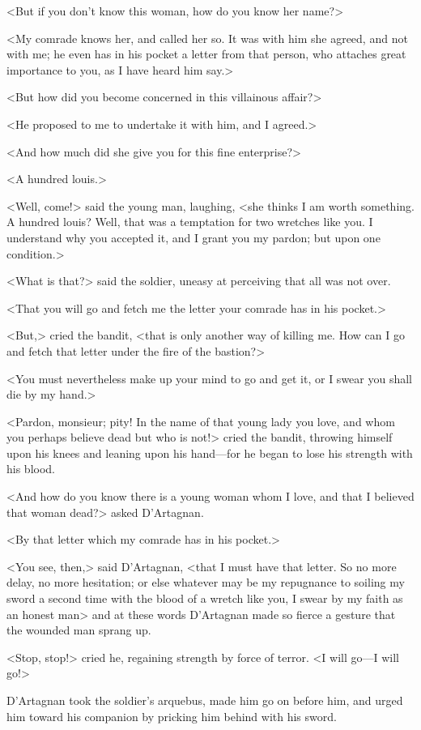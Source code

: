 <But if you don't know this woman, how do you know her name?> 

<My comrade knows her, and called her so. It was with him she agreed, and not with me; he even has in his pocket a letter from that person, who attaches great importance to you, as I have heard him say.> 

<But how did you become concerned in this villainous affair?> 

<He proposed to me to undertake it with him, and I agreed.> 

<And how much did she give you for this fine enterprise?> 

<A hundred louis.> 

<Well, come!> said the young man, laughing, <she thinks I am worth something. A hundred louis? Well, that was a temptation for two wretches like you. I understand why you accepted it, and I grant you my pardon; but upon one condition.> 

<What is that?> said the soldier, uneasy at perceiving that all was not over. 

<That you will go and fetch me the letter your comrade has in his pocket.> 

<But,> cried the bandit, <that is only another way of killing me. How can I go and fetch that letter under the fire of the bastion?> 

<You must nevertheless make up your mind to go and get it, or I swear you shall die by my hand.> 

<Pardon, monsieur; pity! In the name of that young lady you love, and whom you perhaps believe dead but who is not!> cried the bandit, throwing himself upon his knees and leaning upon his hand—for he began to lose his strength with his blood. 

<And how do you know there is a young woman whom I love, and that I believed that woman dead?> asked D'Artagnan. 

<By that letter which my comrade has in his pocket.> 

<You see, then,> said D'Artagnan, <that I must have that letter. So no more delay, no more hesitation; or else whatever may be my repugnance to soiling my sword a second time with the blood of a wretch like you, I swear by my faith as an honest man\longdash> and at these words D'Artagnan made so fierce a gesture that the wounded man sprang up. 

<Stop, stop!> cried he, regaining strength by force of terror. <I will go—I will go!> 

D'Artagnan took the soldier's arquebus, made him go on before him, and urged him toward his companion by pricking him behind with his sword. 

